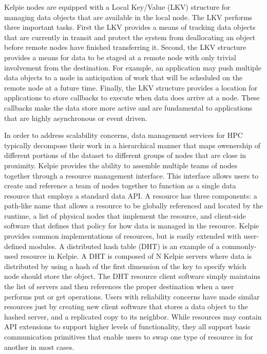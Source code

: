 Kelpie nodes are equipped with a Local Key/Value (LKV) structure for managing data objects that are available in the local node. The LKV performs three important tasks. First the LKV provides a means of tracking data objects that are currently in transit and protect the system from deallocating an object before remote nodes have finished transferring it. Second, the LKV structure provides a means for data to be staged at a remote node with only trivial involvement from the destination. For example, an application may push multiple data objects to a node in anticipation of work that will be scheduled on the remote node at a future time. Finally, the LKV structure provides a location for applications to store callbacks to execute when data does arrive at a node. These callbacks make the data store more active and are fundamental to applications that are highly asynchronous or event driven.

In order to address scalability concerns, data management services for HPC typically decompose their work in a hierarchical manner that maps owenership of different portions of the dataset to different groups of nodes that are close in proximity. Kelpie provides the ability to assemble multiple teams of nodes together through a resource management interface. This interface allows users to create and reference a team of nodes together to function as a single data resource that employs a standard data API. A resource has three components: a path-like name that allows a resource to be globally referenced and located by the runtime, a list of physical nodes that implement the resource, and client-side software that defines that policy for how data is managed in the resource. Kelpie provides common implementations of resources, but is easily extended with user-defined modules. A distributed hash table (DHT) is an example of a commonly-used resource in Kelpie. A DHT is composed of N Kelpie servers where data is distributed by using a hash of the first dimension of the key to specify which node should store the object. The DHT resource client software simply maintains the list of servers and then references the proper destination when a user performs put or get operations. Users with reliability concerns have made similar resources just by creating new client software that stores a data object to the hashed server, and a replicated copy to its neighbor. While resources may contain API extensions to support higher levels of functionality, they all support basic communication primitives that enable users to swap one type of resource in for another in most cases.

